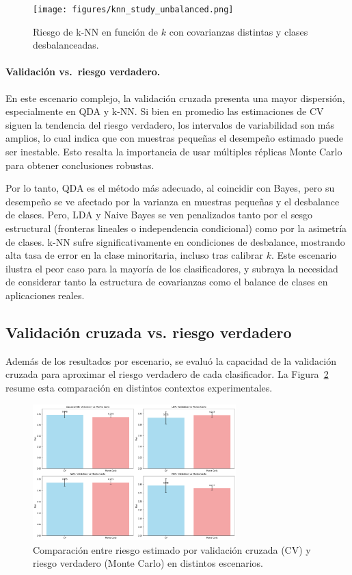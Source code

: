 \documentclass[10pt]{article}
\begin{document}
\begin{figure}[H]
    \centering
    \texttt{[image: figures/knn\_study\_unbalanced.png]}
    \caption{Riesgo de k-NN en función de $k$ con covarianzas distintas y clases desbalanceadas.}
    \label{fig:knn_unbal_diffcov}
\end{figure}

\paragraph{Validación vs.\ riesgo verdadero.}
En este escenario complejo, la validación cruzada presenta una mayor dispersión, especialmente en QDA y k-NN. 
Si bien en promedio las estimaciones de CV siguen la tendencia del riesgo verdadero, 
los intervalos de variabilidad son más amplios, lo cual indica que con muestras pequeñas el desempeño estimado puede ser inestable. 
Esto resalta la importancia de usar múltiples réplicas Monte Carlo para obtener conclusiones robustas.

Por lo tanto, QDA es el método más adecuado, al coincidir con Bayes, pero su desempeño se ve afectado por la varianza en muestras pequeñas y el desbalance de clases.
Pero, LDA y Naive Bayes se ven penalizados tanto por el sesgo estructural (fronteras lineales o independencia condicional) como por la asimetría de clases. k-NN sufre significativamente en condiciones de desbalance, mostrando alta tasa de error en la clase minoritaria, incluso tras calibrar $k$. Este escenario ilustra el peor caso para la mayoría de los clasificadores, y subraya la necesidad de considerar tanto la estructura de covarianzas como el balance de clases en aplicaciones reales.



\subsection*{Validación cruzada vs. riesgo verdadero}

Además de los resultados por escenario, se evaluó la capacidad de la validación cruzada para aproximar el riesgo verdadero de cada clasificador. 
La Figura~\ref{fig:val_comparison} resume esta comparación en distintos contextos experimentales.

\begin{figure}[H]
    \centering
    \includegraphics[width=0.70\textwidth]{figures/validation_comparison.png}
    \caption{Comparación entre riesgo estimado por validación cruzada (CV) y riesgo verdadero (Monte Carlo) en distintos escenarios.}
    \label{fig:val_comparison}
\end{figure}
\end{document}
